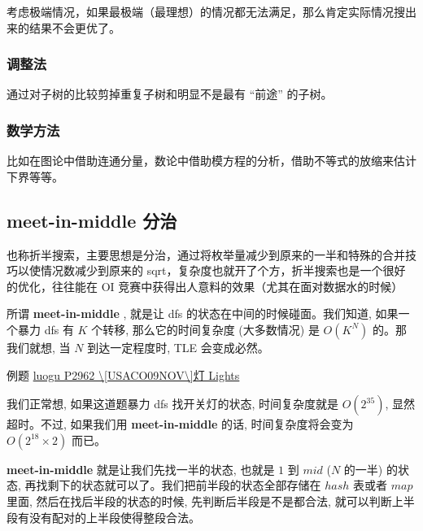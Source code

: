 考虑极端情况，如果最极端（最理想）的情况都无法满足，那么肯定实际情况搜出来的结果不会更优了。

\subsubsection{调整法}

通过对子树的比较剪掉重复子树和明显不是最有 “前途” 的子树。

\subsubsection{数学方法}

比如在图论中借助连通分量，数论中借助模方程的分析，借助不等式的放缩来估计下界等等。

\subsection{meet-in-middle 分治}

也称折半搜索，主要思想是分治，通过将枚举量减少到原来的一半和特殊的合并技巧以使情况数减少到原来的 sqrt，复杂度也就开了个方，折半搜索也是一个很好的优化，往往能在 OI 竞赛中获得出人意料的效果（尤其在面对数据水的时候）

所谓 \textbf{meet-in-middle} , 就是让 dfs 的状态在中间的时候碰面。我们知道, 如果一个暴力 dfs 有 $K$ 个转移, 那么它的时间复杂度 (大多数情况) 是 $O(K^N)$ 的。那我们就想, 当 $N$ 到达一定程度时, TLE 会变成必然。

例题 \href{https://www.luogu.org/problemnew/show/P2962}{luogu P2962 \textbackslash{}[USACO09NOV\textbackslash{}]灯 Lights}

我们正常想, 如果这道题暴力 dfs 找开关灯的状态, 时间复杂度就是 $O(2^{35})$, 显然超时。不过, 如果我们用 \textbf{meet-in-middle} 的话, 时间复杂度将会变为 $O(2^{18} \times 2)$ 而已。

 \textbf{meet-in-middle} 就是让我们先找一半的状态, 也就是 $1$ 到 $mid$ ($N$ 的一半) 的状态, 再找剩下的状态就可以了。我们把前半段的状态全部存储在 $hash$ 表或者 $map$ 里面, 然后在找后半段的状态的时候, 先判断后半段是不是都合法, 就可以判断上半段有没有配对的上半段使得整段合法。
